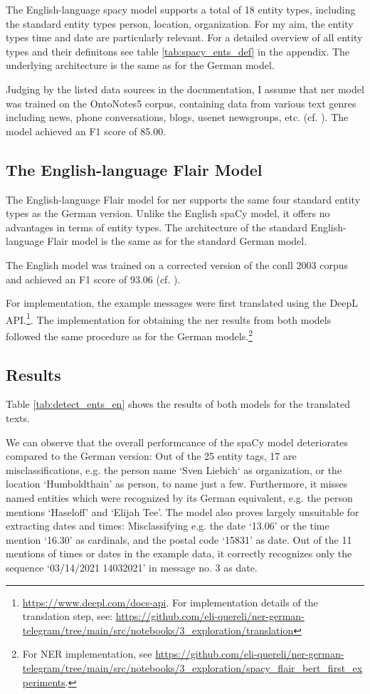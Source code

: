 The English-language spacy model supports a total of 18 entity types, including the standard entity types person, location, organization. For my aim, the entity types time and date are particularly relevant. For a detailed overview of all entity types and their definitons see table \ref{tab:spacy_ents_def} in the appendix. The underlying architecture is the same as for the German model. 

Judging by the listed data sources in the documentation, I assume that \gls{ner} model was trained on the OntoNotes5 corpus, containing data from various text genres including news, phone conversations, blogs, usenet newsgroups, etc. (cf. \cite{ontonotes5}). The model achieved an F1 score of 85.00. 

\subsection{The English-language Flair Model}
The English-language Flair model for \gls{ner} supports the same four standard entity types as the German version. Unlike the English spaCy model, it offers no advantages in terms of entity types. The architecture of the standard English-language Flair model is the same as for the standard German model. 

The English model was trained on a corrected version of the \gls{conll} 2003 corpus and achieved an F1 score of 93.06 (cf. \cite{flair_ner}). 

For implementation, the example messages were first translated using the DeepL API.\footnote{\url{https://www.deepl.com/docs-api}. For implementation details of the translation step, see: \url{https://github.com/eli-quereli/ner-german-telegram/tree/main/src/notebooks/3_exploration/translation}}. The implementation for obtaining the \gls{ner} results from both models followed the same procedure as for the German models.\footnote{For NER implementation, see \url{https://github.com/eli-quereli/ner-german-telegram/tree/main/src/notebooks/3_exploration/spacy_flair_bert_first_experiments}.}

\subsection{Results}
Table \ref{tab:detect_ents_en} shows the results of both models for the translated texts. 

We can observe that the overall performcance of the spaCy model deteriorates compared to the German version: Out of the 25 entity tags, 17 are misclassifications, e.g. the person name `Sven Liebich` as organization, or the location `Humboldthain' as person, to name just a few. Furthermore, it misses named entities which were recognized by its German equivalent, e.g. the person mentions `Haseloff' and `Elijah Tee'. The model also proves largely unsuitable for extracting dates and times: Misclassifying e.g. the date `13.06' or the time mention `16.30' as cardinals, and the postal code `15831' as date. Out of the 11 mentions of times or dates in the example data, it correctly recognizes only the sequence `03/14/2021 14032021' in message no. 3 as date. 

